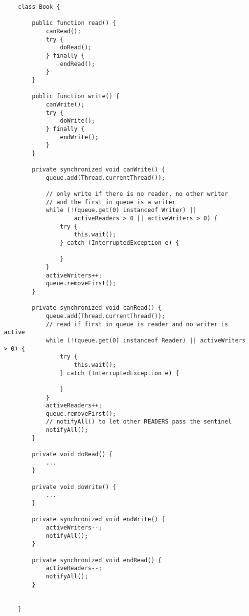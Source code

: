 \noindent
\begin{verbatim}
    class Book {

        public function read() {
            canRead();
            try {
                doRead();
            } finally {
                endRead();
            }
        }

        public function write() {
            canWrite();
            try {
                doWrite();
            } finally {
                endWrite();
            }
        }

        private synchronized void canWrite() {
            queue.add(Thread.currentThread());

            // only write if there is no reader, no other writer
            // and the first in queue is a writer
            while (!(queue.get(0) instanceof Writer) ||
                    activeReaders > 0 || activeWriters > 0) {
                try {
                    this.wait();
                } catch (InterruptedException e) {

                }
            }
            activeWriters++;
            queue.removeFirst();
        }

        private synchronized void canRead() {
            queue.add(Thread.currentThread());
            // read if first in queue is reader and no writer is active
            while (!(queue.get(0) instanceof Reader) || activeWriters > 0) {
                try {
                    this.wait();
                } catch (InterruptedException e) {

                }
            }
            activeReaders++;
            queue.removeFirst();
            // notifyAll() to let other READERS pass the sentinel
            notifyAll();
        }

        private void doRead() {
            ...
        }

        private void doWrite() {
            ...
        }

        private synchronized void endWrite() {
            activeWriters--;
            notifyAll();
        }

        private synchronized void endRead() {
            activeReaders--;
            notifyAll();
        }


    }

\end{verbatim}\\

